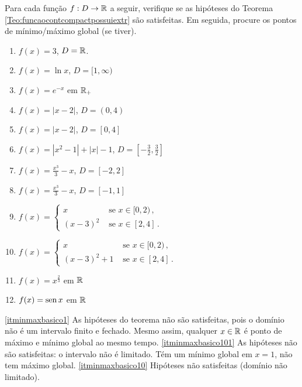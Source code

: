 \begin{exo}
Para cada função $f:D\to \mathbb{R}$ a seguir, verifique se as hipóteses do Teorema 
\ref{Teo:funcaocontcompactpossuiextr} são satisfeitas. Em seguida,
procure os pontos de mínimo/máximo global (se tiver).
\begin{multicols}{2}
\begin{enumerate}
\item\label{itminmaxbasico1} $f(x)=3$, $D=\mathbb{R}$.
\item\label{itminmaxbasico101} $f(x)=\ln x$, $D=[1,\infty)$
\item\label{itminmaxbasico10} $f(x)=e^{-x}$ em $\mathbb{R}_+$
\item\label{itminmaxbasico2} $f(x)=|x-2|$, $D=(0,4)$
\item\label{itminmaxbasico3} $f(x)=|x-2|$, $D=[0,4]$
\item\label{itminmaxbasico4} $f(x)=|x^2-1|+|x|-1$, $D=[-\tfrac32,\tfrac32]$
\item\label{itminmaxbasico5} $f(x)=\frac{x^3}{3}-x$, $D=[-2,2]$
\item\label{itminmaxbasico6} $f(x)=\frac{x^3}{3}-x$, $D=[-1,1]$
\item\label{itminmaxbasico7} $\displaystyle{f(x)=
\begin{cases}
x &\text{ se } x\in [0,2)\,,\\
(x-3)^2  & \text{ se }x\in [2,4]\,.
\end{cases}
}$
\item\label{itminmaxbasico8} $\displaystyle{f(x)=
\begin{cases}
x &\text{ se } x\in [0,2)\,,\\
(x-3)^2+1  & \text{ se }x\in [2,4]\,.
\end{cases}
}$
\item\label{itminmaxbasico9} $f(x)=x^{\frac23}$ em $\mathbb{R}$
\item\label{itminmaxbasico11} $f(x)=\operatorname{sen} x$ em $\mathbb{R}$
\end{enumerate}
\end{multicols}
\vspace{0.01cm}
\begin{sol}
\eqref{itminmaxbasico1} As hipóteses do teorema não são satisfeitas, pois o
domínio não é um intervalo finito e fechado. Mesmo assim, qualquer $x\in \mathbb{R}$ é
ponto de máximo e mínimo global ao mesmo tempo.
\eqref{itminmaxbasico101} As hipóteses não são satisfeitas: o intervalo
não é limitado. Tém um
mínimo global em $x=1$, não tem máximo global.
\eqref{itminmaxbasico10} Hipóteses não satisfeitas (domínio não limitado).

\end{sol}
\end{exo}
